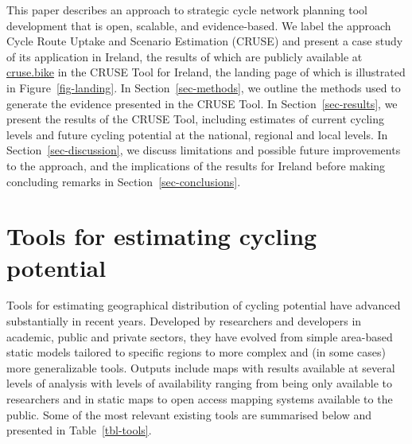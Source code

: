 \documentclass[
  super,
  preprint,
  3p]{elsarticle}
\begin{document}
This paper describes an approach to strategic cycle network planning
tool development that is open, scalable, and evidence-based. We label
the approach Cycle Route Uptake and Scenario Estimation (CRUSE) and
present a case study of its application in Ireland, the results of which
are publicly available at \href{https://cruse.bike/}{cruse.bike} in the
CRUSE Tool for Ireland, the landing page of which is illustrated in
Figure~\ref{fig-landing}. In Section~\ref{sec-methods}, we outline the
methods used to generate the evidence presented in the CRUSE Tool. In
Section~\ref{sec-results}, we present the results of the CRUSE Tool,
including estimates of current cycling levels and future cycling
potential at the national, regional and local levels. In
Section~\ref{sec-discussion}, we discuss limitations and possible future
improvements to the approach, and the implications of the results for
Ireland before making concluding remarks in
Section~\ref{sec-conclusions}.

\hypertarget{tools-for-estimating-cycling-potential}{%
\section{Tools for estimating cycling
potential}\label{tools-for-estimating-cycling-potential}}

Tools for estimating geographical distribution of cycling potential have
advanced substantially in recent years. Developed by researchers and
developers in academic, public and private sectors, they have evolved
from simple area-based static models tailored to specific regions to
more complex and (in some cases) more generalizable tools. Outputs
include maps with results available at several levels of analysis with
levels of availability ranging from being only available to researchers
and in static maps to open access mapping systems available to the
public. Some of the most relevant existing tools are summarised below
and presented in Table~\ref{tbl-tools}.
\end{document}

